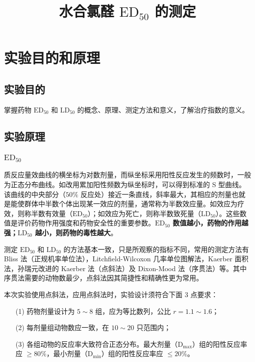 \documentclass[UTF8]{ctexart}
\title{水合氯醛 $\text{ED}_{50} $ 的测定}
\author{}
\begin{document}
\date{}
\maketitle

\section{实验目的和原理}

\subsection{实验目的}

掌握药物 $\text{ED}_{50}$ 和 $\text{LD}_{50}$ 的概念、原理、测定方法和意义，了解治疗指数的意义。

\subsection{实验原理}

\subsubsection{$\text{ED}_{50}$}

质反应量效曲线的横坐标为对数剂量，而纵坐标采用阳性反应发生的频数时，一般为正态分布曲线。如改用累加阳性频数为纵坐标时，可以得到标准的 S 型曲线。该曲线的中央部分（$50\%$ 反应处）接近一条直线，斜率最大，其相应的剂量也就是能使群体中半数个体出现某一效应的剂量，通常称为半数效应量。如效应为疗效，则称半数有效量（$\text{ED}_{50}$）；如效应为死亡，则称半数致死量（$\text{LD}_{50}$）。这些数值是评价药物作用强度和药物安全性的重要参数。\textbf{$\text{ED}_{50}$ 数值越小，药物的作用越强；$\text{LD}_{50}$ 越小，则药物的毒性越大}。

测定 $\text{ED}_{50}$ 和 $\text{LD}_{50}$ 的方法基本一致，只是所观察的指标不同，常用的测定方法有 Bliss 法（正规机率单位法），Litchfield-Wilcoxon 几率单位图解法，Kaerber 面积法，孙瑞元改进的 Kaerber 法（点斜法）及 Dixon-Mood 法（序贯法）等。其中序贯法需要的动物数最少，点斜法因其简捷性和精确性更为常用。

本次实验使用点斜法，应用点斜法时，实验设计须符合下面 3 点要求：

\begin{itemize}
    \item [(1)] 药物剂量设计为 $5\sim 8$ 组，应为等比数列，公比 $r=1.1\sim 1.6$；
    \item [(2)] 每剂量组动物数应一致，在 $10\sim 20$ 只范围内；
    \item [(3)] 各组动物的反应率大致符合正态分布。最大剂量（$\text{D}_{\text{max}}$）组的阳性反应率应 $\geq 80\%$，最小剂量（$\text{D}_{\text{min}}$）组的阳性反应率应 $\leq 20\%$。
\end{itemize}
\end{document}
